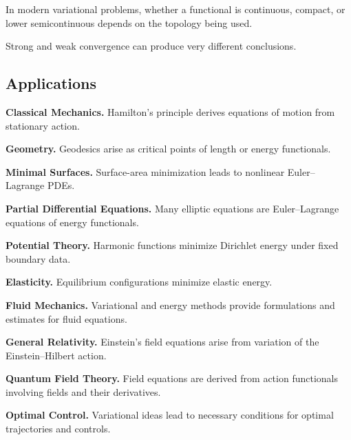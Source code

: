 In modern variational problems, whether a functional is continuous,
compact, or lower semicontinuous depends on the topology being used.

Strong and weak convergence can produce very different conclusions.

\subsection{Applications}
\label{subsec:calculus-variations-applications}

\begin{applicationbox}
\textbf{Classical Mechanics.}
Hamilton's principle derives equations of motion from stationary action.

\medskip

\textbf{Geometry.}
Geodesics arise as critical points of length or energy functionals.

\medskip

\textbf{Minimal Surfaces.}
Surface-area minimization leads to nonlinear Euler--Lagrange PDEs.

\medskip

\textbf{Partial Differential Equations.}
Many elliptic equations are Euler--Lagrange equations of energy
functionals.

\medskip

\textbf{Potential Theory.}
Harmonic functions minimize Dirichlet energy under fixed boundary data.

\medskip

\textbf{Elasticity.}
Equilibrium configurations minimize elastic energy.

\medskip

\textbf{Fluid Mechanics.}
Variational and energy methods provide formulations and estimates for
fluid equations.

\medskip

\textbf{General Relativity.}
Einstein's field equations arise from variation of the Einstein--Hilbert
action.

\medskip

\textbf{Quantum Field Theory.}
Field equations are derived from action functionals involving fields and
their derivatives.

\medskip

\textbf{Optimal Control.}
Variational ideas lead to necessary conditions for optimal trajectories
and controls.


\end{applicationbox}
